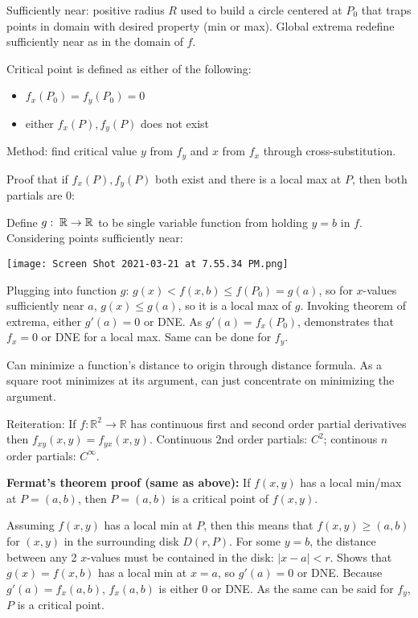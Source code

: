 Sufficiently near: positive radius $R$ used to build a circle centered at $P_0$ that traps points in domain with desired property (min or max).
Global extrema redefine sufficiently near as in the domain of $f$.

Critical point is defined as either of the following:
\begin{itemize}
    \item $f_x(P_0)=f_y(P_0)=0$
    \item either $f_x(P),f_y(P)$ does not exist
\end{itemize}

Method: find critical value $y$ from $f_y$ and $x$ from $f_x$ through cross-substitution.

Proof that if $f_x(P),f_y(P)$ both exist and there is a local max at $P$, then both partials are 0:

Define $g:\;\mathbb{R}\rightarrow \mathbb{R}$ to be single variable function from holding $y=b$ in $f$. Considering points sufficiently near:

\texttt{[image: Screen Shot 2021-03-21 at 7.55.34 PM.png]}

Plugging into function $g$: $g(x) < f(x,b) \leq f(P_0)=g(a)$, so for $x$-values sufficiently
near $a$, $g(x)\leq g(a)$, so it is a local max of $g$. Invoking theorem of extrema, either $g'(a)=0$ or DNE. As $g'(a)=f_x(P_0)$, demonstrates that
$f_x=0$ or DNE for a local max. Same can be done for $f_y$.

Can minimize a function's distance to origin through distance formula. As a square root minimizes
at its argument, can just concentrate on minimizing the argument.

Reiteration: If $f: \mathbb{R}^{2} \rightarrow \mathbb{R}$ has continuous first and second order partial derivatives then $f_{x y}(x, y)=f_{y x}(x, y)$.
Continuous 2nd order partials: $C^2$; continous $n$ order partials: $C^\infty$.

\textbf{Fermat's theorem proof (same as above):} If $f(x,y)$ has a local min/max at $P=(a,b)$, then $P=(a,b)$ is a critical point of $f(x,y)$.

Assuming $f(x,y)$ has a local min at $P$, then this means that $f(x,y) \geq (a,b)$ for $(x,y)$ in the surrounding disk $D(r,P)$.
For some $y=b$, the distance between any 2 $x$-values must be contained in the disk: $|x-a|<r$. Shows that $g(x)=f(x,b)$ has a local min
at $x=a$, so $g'(a)=0$ or DNE. Because $g'(a)=f_x(a,b)$, $f_x(a,b)$ is either 0 or DNE. As the same can be said for $f_y$, $P$ is a critical point.

